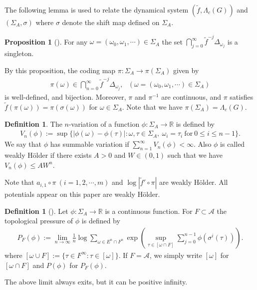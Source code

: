 \documentclass{article}
\theoremstyle{definition}
\newtheorem{prop}[thm]{Proposition}
\newtheorem{definition}[thm]{Definition}
\begin{document}
The following lemma is used to relate the dynamical system $(\tilde f, \Lambda_c(G))$ and $(\Sigma_A,\sigma)$ where $\sigma$ denote the shift map defined on $\Sigma_A$.
\begin{prop}[{\cite[Proposition 3.1]{jaerisch2021mixed}}] 
For any $\omega=(\omega_0,\omega_1,\cdots) \in \Sigma_A$ the set 
    $\bigcap_{j=0}^{\infty}{\tilde{f}^{-j}\Delta_{\omega_j}}\nonumber$
    is a singleton.
\end{prop}
By this proposition, the coding map $\pi:\Sigma_A\rightarrow \pi(\Sigma_A)$ given by 
\begin{align}
    \pi(\omega)\in\bigcap_{n=0}^\infty{\tilde{f}^{-j}\Delta_{\omega_j}},\ \ \ (\omega=(\omega_0,\omega_1,\cdots) \in \Sigma_A)\nonumber
\end{align}
is well-defined, and bijection. Moreover, $\pi$ and $\pi^{-1}$ are continuous, and $\pi$ satisfies $\tilde{f}(\pi(\omega))=\pi(\sigma(\omega))$ for $\omega \in \Sigma_A$. Note that we have $\pi(\Sigma_A)=\Lambda_c(G)$. 
\begin{definition}\label{definition variation}
The $n$-variation of a function $\phi:\Sigma_A\rightarrow \mathbb{R}$ is defined by 
\begin{align}
    V_n(\phi):=\sup \lbrace |\phi(\omega)-\phi(\tau)|:\omega,\tau\in\Sigma_A,\ \omega_i=\tau_i\ \text{for}\ 0\leq i\leq n-1\rbrace\nonumber.
\end{align}
We say that $\phi$ has summable variation if $\sum_{n=1}^{\infty} V_n(\phi)<\infty$. Also $\phi$ is called weakly H\"older if there exists $A>0$ and $W\in(0,1)$ such that we have $V_n(\phi)\leq A W^n$.

\end{definition}
Note that $a_{i,1}\circ \pi\ (i=1,2,\cdots, m)$ and $\log|\tilde{f}'\circ \pi|$ are weakly H\"older. All potentials appear on this paper are weakly H\"older.


 \begin{definition}[{\cite{mauldin2003graph}}]\label{Definition of pressure}
Let $\phi:\Sigma_A\rightarrow \mathbb{R}$ is a continuous function. For $F\subset\mathcal{A}$ the topological pressure of $\phi$ is defined by 
 \begin{align}
     P_F(\phi):=\lim_{n\to\infty}\frac{1}{n}\log \sum_{\omega\in E^n\cap F^n}\exp\left(\sup_{\tau\in[\omega\cap F]}\sum_{j=0}^{n-1}\phi(\sigma^i(\tau))\right)\nonumber.
 \end{align}
 where $[\omega\cup F]:=\lbrace\tau\in F^\infty:\tau\in[\omega]\rbrace$. If $F=\mathcal{A}$, we simply write $[\omega]$ for $[\omega\cap F]$ and $P(\phi)$ for $P_F(\phi)$.
\end{definition}
The above limit always exits, but it can be positive infinity.
\end{document}
